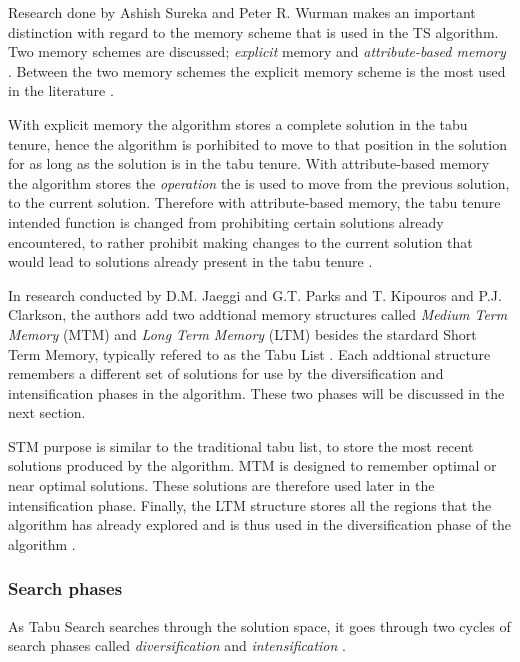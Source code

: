 Research done by Ashish Sureka and Peter R. Wurman makes an important distinction with regard to the memory scheme that is used in the TS algorithm. Two memory schemes are discussed; \emph{explicit} memory and \emph{attribute-based memory} \cite{TabuBiddingStrats,TabuFormGames}. Between the two memory schemes the explicit memory scheme is the most used in the literature \cite{TabuVechicleRoutingWithTimeWindows}.

With explicit memory the algorithm stores a complete solution in the tabu tenure, hence the algorithm is porhibited to move to that position in the solution for as long as the solution is in the tabu tenure\cite{TabuBiddingStrats,TabuFormGames}. With attribute-based memory the algorithm stores the \emph{operation} the is used to move from the previous solution, to the current solution\cite{TabuBiddingStrats,TabuFormGames}. Therefore with attribute-based memory, the tabu tenure intended function is changed from prohibiting certain solutions already encountered, to rather prohibit making changes to the current solution that would lead to solutions already present in the tabu tenure \cite{TabuBiddingStrats,TabuFormGames}.

In research conducted by D.M. Jaeggi and G.T. Parks and T. Kipouros and P.J. Clarkson, the authors add two addtional memory structures called \emph{Medium Term Memory} (MTM) and \emph{Long Term Memory} (LTM) besides the stardard Short Term Memory, typically refered to as the Tabu List \cite{MultiObjTabu} . Each addtional structure remembers a different set of solutions for use by the diversification and intensification phases in the algorithm. These two phases will be discussed in the next section.

STM purpose is similar to the traditional tabu list, to store the most recent solutions produced by the algorithm. MTM is designed to remember optimal or near optimal solutions. These solutions are therefore used later in the intensification phase. Finally, the LTM structure stores all the regions that the algorithm has already explored and is thus used in the diversification phase of the algorithm \cite{MultiObjTabu}.

\subsubsection{Search phases}
As Tabu Search searches through the solution space, it goes through two cycles of search phases called \emph{diversification} and \emph{intensification} \cite{TabuParameterization,TabuCrewSchedulingProblem,NonlinearGlobalTabu,SelfControllingReactiveTabu}.

